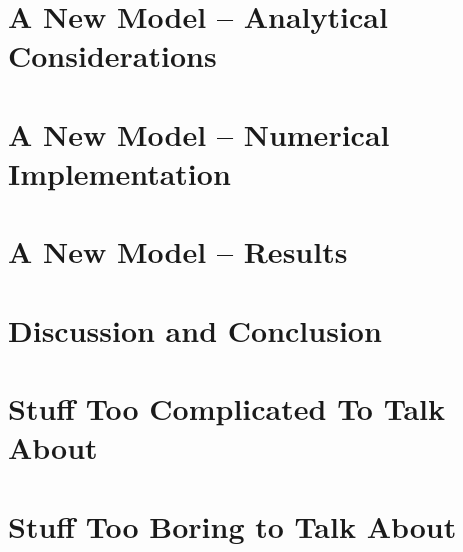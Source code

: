 \documentclass[12pt]{report}   %
\begin{document}
\chapter{A New Model -- Analytical Considerations}

\clearpage{\pagestyle{empty}\cleardoublepage}

\chapter{A New Model -- Numerical Implementation}

\clearpage{\pagestyle{empty}\cleardoublepage}

\chapter{A New Model -- Results}

\clearpage{\pagestyle{empty}\cleardoublepage}

\chapter{Discussion and Conclusion}

\clearpage{\pagestyle{empty}\cleardoublepage}

\appendix
\chapter{Stuff Too Complicated To Talk About}

\clearpage{\pagestyle{empty}\cleardoublepage}

\chapter{Stuff Too Boring to Talk About}

\clearpage{\pagestyle{empty}\cleardoublepage}



\begin{spacing}{0.9}
  
\end{spacing}
\end{document}
